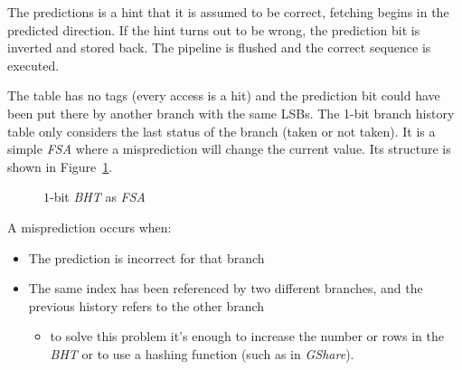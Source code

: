 \documentclass[english]{article}
\begin{document}
The predictions is a hint that it is assumed to be correct, fetching begins in the predicted direction.
If the hint turns out to be wrong, the prediction bit is inverted and stored back.
The pipeline is flushed and the correct sequence is executed.

The table has no tags (every access is a hit) and the prediction bit
could have been put there by another branch with the same LSBs.
The 1-bit branch history table only considers the last status of the branch (taken or not taken).
It is a simple \textit{FSA} where a misprediction will change the current value.
Its structure is shown in Figure~\ref{fig:BHT-as-FSA}.

\begin{figure}[htbp]
  \bigskip
  \centering


  \caption{\(1\)-bit \textit{BHT} as \textit{FSA}}
  \label{fig:BHT-as-FSA}
  \bigskip
\end{figure}

A misprediction occurs when:

\begin{itemize}
  \item The prediction is incorrect for that branch
  \item The same index has been referenced by two different branches, and the previous history refers to the other branch
        \begin{itemize}
          \item to solve this problem it's enough to increase the number or rows in the \textit{BHT} or to use a hashing function (such as in \textit{GShare}).
        \end{itemize}
\end{itemize}
\end{document}
